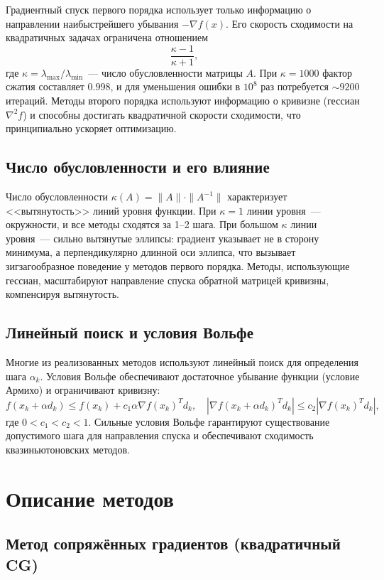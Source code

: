 \documentclass[12pt]{article}
\begin{document}
Градиентный спуск первого порядка использует только информацию о направлении наибыстрейшего убывания $-\nabla f(x)$. Его скорость сходимости на квадратичных задачах ограничена отношением
\[
    \frac{\kappa - 1}{\kappa + 1},
\]
где $\kappa = \lambda_{\max} / \lambda_{\min}$~--- число обусловленности матрицы $A$. При $\kappa = 1000$ фактор сжатия составляет $0.998$, и для уменьшения ошибки в $10^8$ раз потребуется $\sim 9200$ итераций. Методы второго порядка используют информацию о кривизне (гессиан $\nabla^2 f$) и способны достигать квадратичной скорости сходимости, что принципиально ускоряет оптимизацию.

\subsection{Число обусловленности и его влияние}

Число обусловленности $\kappa(A) = \|A\| \cdot \|A^{-1}\|$ характеризует <<вытянутость>> линий уровня функции. При $\kappa = 1$ линии уровня~--- окружности, и все методы сходятся за 1--2 шага. При большом $\kappa$ линии уровня~--- сильно вытянутые эллипсы: градиент указывает не в сторону минимума, а перпендикулярно длинной оси эллипса, что вызывает зигзагообразное поведение у методов первого порядка. Методы, использующие гессиан, масштабируют направление спуска обратной матрицей кривизны, компенсируя вытянутость.

\subsection{Линейный поиск и условия Вольфе}

Многие из реализованных методов используют линейный поиск для определения шага $\alpha_k$. Условия Вольфе обеспечивают достаточное убывание функции (условие Армихо) и ограничивают кривизну:
\[
    f(x_k + \alpha d_k) \leq f(x_k) + c_1 \alpha \nabla f(x_k)^T d_k, \quad
    |\nabla f(x_k + \alpha d_k)^T d_k| \leq c_2 |\nabla f(x_k)^T d_k|,
\]
где $0 < c_1 < c_2 < 1$. Сильные условия Вольфе гарантируют существование допустимого шага для направления спуска и обеспечивают сходимость квазиньютоновских методов.

\section{Описание методов}

\subsection{Метод сопряжённых градиентов (квадратичный CG)}
\end{document}
